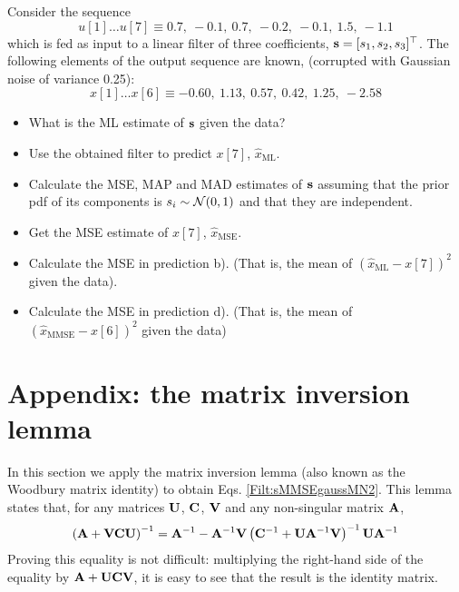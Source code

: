 \begin{prob}
\label{ProbFiltrado}

Consider the sequence
$$
u[1] \ldots u[7] \equiv 0.7,~-0.1,~0.7,~-0.2,~-0.1,~1.5,~-1.1
$$
which is fed as input to a linear filter of three coefficients, ${\mathbf s} = [s_1, s_2, s_3]^\top$. The following elements of the output sequence are known, (corrupted with Gaussian noise of variance 0.25):
$$
x[1] \ldots x[6] \equiv  -0.60,~1.13,~0.57,~0.42,~1.25,~-2.58
$$

\begin {itemize}
\item [a)] What is the ML estimate of ${\mathbf s}$ given the data? %
\item [b)] Use the obtained filter to predict $x[7]$, $\hat{x}_\text{ML}$.
\item [c)] Calculate the MSE, MAP and MAD estimates of ${\mathbf s}$ assuming that the prior pdf of its components is $s_i \sim {\mathcal N}(0,1)$ and that they are independent.
\item [d)] Get the MSE estimate of $x[7]$, $\hat{x}_\text{MSE}$.
\item [e)] Calculate the MSE in prediction b). (That is, the mean of $ (\hat{x}_\text{ML} -x[7])^2$ given the data).
\item [f)] Calculate the MSE in prediction d). (That is, the mean of $(\hat{x}_\text{MMSE} -x[6])^2 $ given the data)
\end{itemize}

\end{prob}


\section{Appendix: the matrix inversion lemma}
\label{Sec:mil}

In this section we apply the matrix inversion lemma (also known as the Woodbury matrix identity) to obtain Eqs. \eqref{Filt:sMMSEgaussMN2}. This lemma states that, for any matrices ${\bf U}$, ${\bf C}$, ${\bf V}$ and any non-singular matrix ${\bf A}$, 
\begin{align}
\left({\bf A} + {\bf V}{\bf C}{\bf U} \right)^{-1}
    = {\bf A}^{-1} 
    - {\bf A}^{-1}{\bf V} \left({\bf C}^{-1} 
    + {\bf U}{\bf A}^{-1}{\bf V} \right)^{-1} {\bf U}{\bf A}^{-1}
\end{align}
Proving this equality is not difficult: multiplying the right-hand side of the equality by ${\bf A} + {\bf U}{\bf C}{\bf V}$, it is easy to see that the result is the identity matrix.

